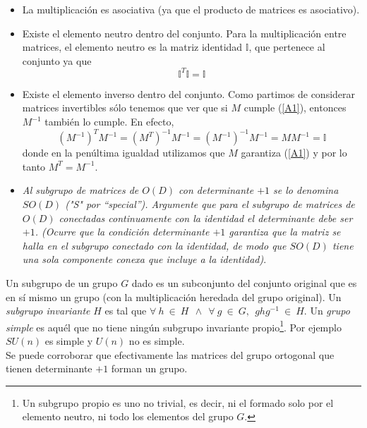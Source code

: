 \begin{solution}
\begin{itemize}
    \item La multiplicación es asociativa (ya que el producto de matrices es asociativo).
    \item Existe el elemento neutro dentro del conjunto. Para la multiplicación entre matrices, el elemento neutro es la matriz identidad $\mathbb{I}$, que pertenece al conjunto ya que 
\begin{equation*}
    \mathbb{I}^{T} \mathbb{I}=\mathbb{I}
\end{equation*}
    \item Existe el elemento inverso dentro del conjunto. Como partimos de considerar matrices invertibles sólo tenemos que ver que si $M$ cumple (\ref{A1}), entonces $M^{-1}$ también lo cumple. En efecto,
\begin{equation}
    \left(M^{-1}\right)^{T} M^{-1}=\left(M^{T}\right)^{-1} M^{-1}=\left(M^{-1}\right)^{-1} M^{-1}=M M^{-1}=\mathbb{I}
\end{equation}
donde en la penúltima igualdad utilizamos que $M$ garantiza (\ref{A1}) y por lo tanto $M^{T}=M^{-1}$.
\end{itemize}
\vspace{0.2cm}
\begin{itemize}
    \item[b)] \emph{Al subgrupo de matrices de $O(D)$ con determinante $+1$ se lo denomina $S O(D)$ ("S" por ``special''). Argumente que para el subgrupo de matrices de $O(D)$ conectadas continuamente con la identidad el determinante debe ser $+1$. (Ocurre que la condición determinante $+1$ garantiza que la matriz se halla en el subgrupo conectado con la identidad, de modo que $S O(D)$ tiene una sola componente conexa que incluye a la identidad)}.
\end{itemize}
\vspace{0.2cm}
Un subgrupo de un grupo $G$ dado es un subconjunto del conjunto original que es en sí mismo un grupo (con la multiplicación heredada del grupo original). Un \emph{subgrupo invariante} $H$ es tal que $\forall ~h~\in ~H~~\wedge ~~\forall ~g~\in ~G,~~ghg^{-1}~\in~H$. Un \emph{grupo simple} es aquél que no tiene ningún subgrupo invariante propio\footnote{Un subgrupo propio es uno no trivial, es decir, ni el formado solo por el elemento neutro, ni todo los elementos del grupo $G$.}. Por ejemplo $SU(n)$ es simple y $U(n)$ no es simple.\\

Se puede corroborar que efectivamente las matrices del grupo ortogonal que tienen determinante $+1$ forman un grupo.\\


\end{solution}
